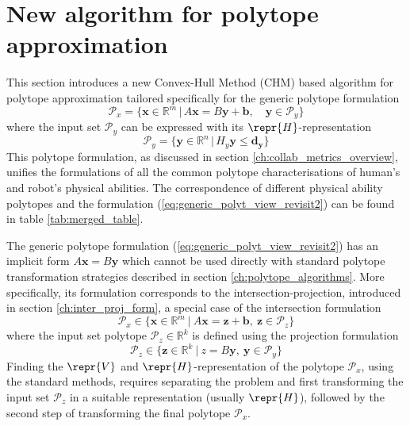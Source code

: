 \section{New algorithm for polytope approximation}
\label{ch:algorihtm_ichm}

This section introduces a new Convex-Hull Method (CHM) based algorithm for polytope approximation tailored specifically for the generic polytope formulation
\begin{equation}
    \mathcal{P}_x = \big\{ \bm{x}\in \mathbb{R}^{m}\, |\,A\bm{x} = B\bm{y} + \bm{b}, \quad  \bm{y}\in\mathcal{P}_y  \big\}
    \label{eq:generic_polyt_view_revisit2}
\end{equation}
where the input set $\mathcal{P}_y$ can be expressed with its $\repr{H}$-representation
\begin{equation}
    \mathcal{P}_y = \big\{ \bm{y}\in \mathbb{R}^{n}\, |\,H_y\bm{y} \leq \bm{d_y}\big\}
    \label{eq:generic_poly_input_set_revisit2}
\end{equation} 
This polytope formulation, as discussed in section \ref{ch:collab_metrics_overview}, unifies the formulations of all the common polytope characterisations of human's and robot's physical abilities. The correspondence of different physical ability polytopes and the formulation (\ref{eq:generic_polyt_view_revisit2}) can be found in table \ref{tab:merged_table}. 

The generic polytope formulation (\ref{eq:generic_polyt_view_revisit2}) has an implicit form $A\bm{x}=B\bm{y}$ which cannot be used directly with standard polytope transformation strategies described in section \ref{ch:polytope_algorithms}. More specifically, its formulation corresponds to the intersection-projection, introduced in section \ref{ch:inter_proj_form}, a special case of the intersection formulation 
\begin{equation}
    \mathcal{P}_x \in \{\bm{x}\in \mathbb{R}^m~|~A \bm{x} = \bm{z} + \bm{b},~ \bm{z} \in \mathcal{P}_z\} 
\end{equation}
where the input set polytope $\mathcal{P}_z\in\mathbb{R}^k$ is defined using the projection formulation
\begin{equation}
    \mathcal{P}_z \in \{\bm{z}\in \mathbb{R}^k~|~z = B\bm{y},~ \bm{y} \in \mathcal{P}_y\} 
\end{equation}
Finding the $\repr{V}$ and $\repr{H}$-representation of the polytope $\mathcal{P}_x$, using the standard methods, requires separating the problem and first transforming the input set $\mathcal{P}_z$ in a suitable representation (usually $\repr{H}$), followed by the second step of transforming the final polytope $\mathcal{P}_x$. 

